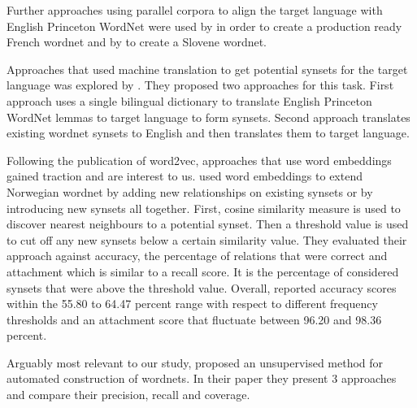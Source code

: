 Further approaches using parallel corpora to align the target language with English Princeton WordNet were used by \textcite{sagot_building_2008} in order to create a production ready French wordnet and by \textcite{fiser_leveraging_2009} to create a Slovene wordnet.

Approaches that used machine translation to get potential synsets for the target language was explored by \textcite{lam_automatically_2014}.
They proposed two approaches for this task.
First approach uses a single bilingual dictionary to translate English Princeton WordNet lemmas to target language to form synsets.
Second approach translates existing wordnet synsets to English and then translates them to target language.

Following the publication of word2vec, approaches that use word embeddings gained traction and are interest to us.
\textcite{sand_wordnet_2017} used word embeddings to extend Norwegian wordnet by adding new relationships on existing synsets or by introducing new synsets all together.
First, cosine similarity measure is used to discover nearest neighbours to a potential synset.
Then a threshold value is used to cut off any new synsets below a certain similarity value.
They evaluated their approach against accuracy, the percentage of relations that were correct and attachment which is similar to a recall score.
It is the percentage of considered synsets that were above the threshold value.
Overall, \citeauthor{sand_wordnet_2017} reported accuracy scores within the 55.80 to 64.47 percent range with respect to different frequency thresholds and an attachment score that fluctuate between 96.20 and 98.36 percent.

Arguably most relevant to our study, \textcite{khodak_automated_2017} proposed an unsupervised method for automated construction of wordnets.
In their paper  they present 3 approaches and compare their precision, recall and coverage.

